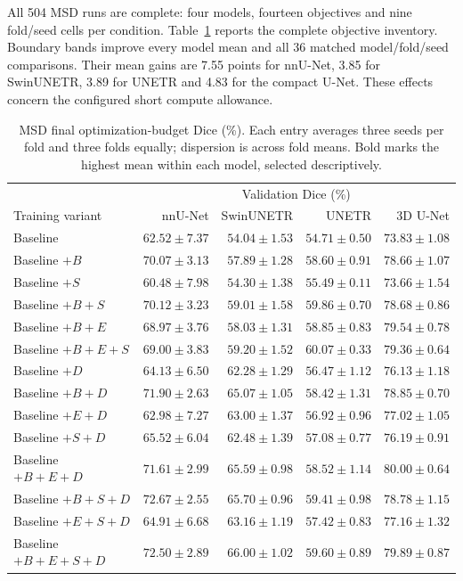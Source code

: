 \documentclass[12pt,a4paper]{article}
\begin{document}
All 504 MSD runs are complete: four models, fourteen objectives and
nine fold/seed cells per condition. Table~\ref{tab:msd-noaug-matrix}
reports the complete objective inventory. Boundary bands improve every
model mean and all 36 matched model/fold/seed comparisons. Their mean
gains are 7.55 points for nnU-Net, 3.85 for SwinUNETR, 3.89 for UNETR
and 4.83 for the compact U-Net. These effects concern the configured
short compute allowance.
\begin{table}[htbp]
\centering\small{}
\setlength{\tabcolsep}{5pt}
\renewcommand{\arraystretch}{1.15}
\begin{tabular}{@{}lrrrr@{}}
\hline
 & \multicolumn{4}{c}{Validation Dice (\%)} \\
Training variant & nnU-Net & SwinUNETR & UNETR & 3D U-Net \\
\hline
Baseline & $62.52\pm7.37$ & $54.04\pm1.53$ & $54.71\pm0.50$ & $73.83\pm1.08$ \\
Baseline $+B$ & $70.07\pm3.13$ & $57.89\pm1.28$ & $58.60\pm0.91$ & $78.66\pm1.07$ \\
Baseline $+S$ & $60.48\pm7.98$ & $54.30\pm1.38$ & $55.49\pm0.11$ & $73.66\pm1.54$ \\
Baseline $+B+S$ & $70.12\pm3.23$ & $59.01\pm1.58$ & $59.86\pm0.70$ & $78.68\pm0.86$ \\
Baseline $+B+E$ & $68.97\pm3.76$ & $58.03\pm1.31$ & $58.85\pm0.83$ & $79.54\pm0.78$ \\
Baseline $+B+E+S$ & $69.00\pm3.83$ & $59.20\pm1.52$ & $\mathbf{60.07\pm0.33}$ & $79.36\pm0.64$ \\
Baseline $+D$ & $64.13\pm6.50$ & $62.28\pm1.29$ & $56.47\pm1.12$ & $76.13\pm1.18$ \\
Baseline $+B+D$ & $71.90\pm2.63$ & $65.07\pm1.05$ & $58.42\pm1.31$ & $78.85\pm0.70$ \\
Baseline $+E+D$ & $62.98\pm7.27$ & $63.00\pm1.37$ & $56.92\pm0.96$ & $77.02\pm1.05$ \\
Baseline $+S+D$ & $65.52\pm6.04$ & $62.48\pm1.39$ & $57.08\pm0.77$ & $76.19\pm0.91$ \\
Baseline $+B+E+D$ & $71.61\pm2.99$ & $65.59\pm0.98$ & $58.52\pm1.14$ & $\mathbf{80.00\pm0.64}$ \\
Baseline $+B+S+D$ & $\mathbf{72.67\pm2.55}$ & $65.70\pm0.96$ & $59.41\pm0.98$ & $78.78\pm1.15$ \\
Baseline $+E+S+D$ & $64.91\pm6.68$ & $63.16\pm1.19$ & $57.42\pm0.83$ & $77.16\pm1.32$ \\
Baseline $+B+E+S+D$ & $72.50\pm2.89$ & $\mathbf{66.00\pm1.02}$ & $59.60\pm0.89$ & $79.89\pm0.87$ \\
\hline
\end{tabular}
\caption{MSD final optimization-budget Dice (\%). Each entry averages three seeds per fold and three folds equally; dispersion is across fold means. Bold marks the highest mean within each model, selected descriptively.}
\label{tab:msd-noaug-matrix}
\end{table}
\end{document}
